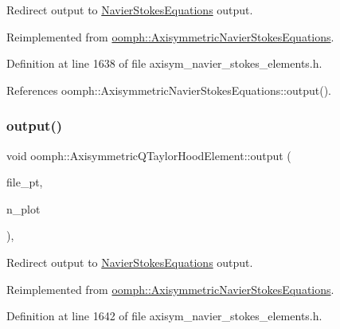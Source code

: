 Redirect output to \hyperlink{classoomph_1_1NavierStokesEquations}{Navier\+Stokes\+Equations} output. 



Reimplemented from \hyperlink{classoomph_1_1AxisymmetricNavierStokesEquations_a61129dd7505ac363862946bd8b3ea5bf}{oomph\+::\+Axisymmetric\+Navier\+Stokes\+Equations}.



Definition at line 1638 of file axisym\+\_\+navier\+\_\+stokes\+\_\+elements.\+h.



References oomph\+::\+Axisymmetric\+Navier\+Stokes\+Equations\+::output().

\mbox{\label{classoomph_1_1AxisymmetricQTaylorHoodElement_a4c2fcefe0593bb39d6c4937b0fdc1292}} 
\subsubsection{\texorpdfstring{output()}{output()}\hspace{0.1cm}{\footnotesize\ttfamily [4/4]}}
{\footnotesize\ttfamily void oomph\+::\+Axisymmetric\+Q\+Taylor\+Hood\+Element\+::output (\begin{DoxyParamCaption}\item[{F\+I\+LE $\ast$}]{file\+\_\+pt,  }\item[{const unsigned \&}]{n\+\_\+plot }\end{DoxyParamCaption})\hspace{0.3cm}{\ttfamily [inline]}, {\ttfamily [virtual]}}



Redirect output to \hyperlink{classoomph_1_1NavierStokesEquations}{Navier\+Stokes\+Equations} output. 



Reimplemented from \hyperlink{classoomph_1_1AxisymmetricNavierStokesEquations_abc2ca00250845e243da3f4e0845b2c96}{oomph\+::\+Axisymmetric\+Navier\+Stokes\+Equations}.



Definition at line 1642 of file axisym\+\_\+navier\+\_\+stokes\+\_\+elements.\+h.




